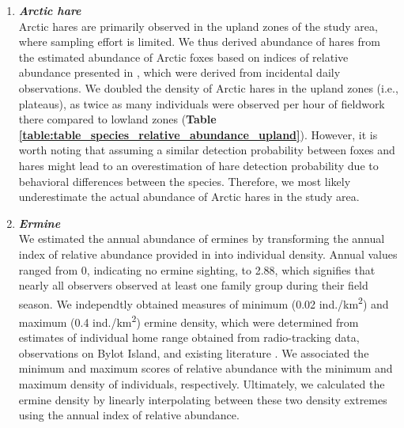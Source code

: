 \documentclass[a4paper,twoside,12pt]{article}
\begin{document}
\begin{enumerate}[label=\alph*.]
                \item[] \textit{\textbf{Arctic hare}}\\
                Arctic hares are primarily observed in the upland zones of the study area, where sampling effort is limited. We thus derived abundance of hares from the estimated abundance of Arctic foxes based on indices of relative abundance presented in \citep{gauthier2024a}, which were derived from incidental daily observations. We doubled the density of Arctic hares in the upland zones (i.e., plateaus), as twice as many individuals were observed per hour of fieldwork there compared to lowland zones (\textbf{Table \ref{table:table_species_relative_abundance_upland}}). However, it is worth noting that assuming a similar detection probability between foxes and hares might lead to an overestimation of hare detection probability due to behavioral differences between the species. Therefore, we most likely underestimate the actual abundance of Arctic hares in the study area.
                
                \item[] \textit{\textbf{Ermine}}\\
                We estimated the annual abundance of ermines by transforming the annual index of relative abundance provided in \citet{bolduc2023} into individual density. Annual values ranged from 0, indicating no ermine sighting, to 2.88, which signifies that nearly all observers observed at least one family group during their field season. We independtly obtained measures of minimum (0.02 ind./km\textsuperscript{2}) and maximum (0.4 ind./km\textsuperscript{2}) ermine density, which were determined from estimates of individual home range obtained from radio-tracking data, observations on Bylot Island, and existing literature \citep{legagneux2012, bilodeau2013}. We associated the minimum and maximum scores of relative abundance with the minimum and maximum density of individuals, respectively. Ultimately, we calculated the ermine density by linearly interpolating between these two density extremes using the annual index of relative abundance.
                

\end{enumerate}
\end{document}
